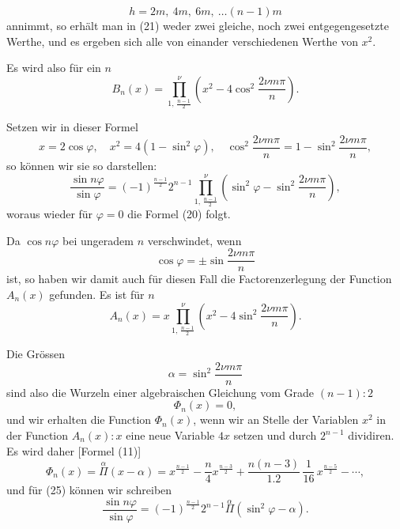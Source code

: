 \[
h = 2m,\ 4m,\ 6m,\ \ldots (n-1)m
\]
annimmt, so erhält man in (21) weder zwei gleiche, noch zwei entgegengesetzte Werthe, und es ergeben sich alle von einander verschiedenen Werthe von $x^2$.

Es wird also für ein  $n$
\[
B_n(x) = \prod\limits_{1,\,\frac{n-1}{2}}^{\nu} \left(x^2 - 4\cos^2\frac{2\nu m\pi}{n}\right). \tag{24}
\]

Setzen wir in dieser Formel
\[
x = 2\cos\varphi,\quad x^2 = 4(1-\sin^2\varphi),\quad \cos^2\frac{2\nu m\pi}{n} = 1 - \sin^2\frac{2\nu m\pi}{n},
\]
so können wir sie so darstellen:
\[
\frac{\sin n\varphi}{\sin\varphi} = (-1)^{\frac{n-1}{2}} 2^{n-1} \prod\limits_{1,\,\frac{n-1}{2}}^{\nu} \left(\sin^2\varphi - \sin^2\frac{2\nu m\pi}{n}\right), \tag{25}
\]
woraus wieder für $\varphi=0$ die Formel (20) folgt.

Da $\cos n\varphi$ bei ungeradem $n$ verschwindet, wenn
\[
\cos\varphi = \pm \sin\frac{2\nu m\pi}{n}
\]
ist, so haben wir damit auch für diesen Fall die Factorenzerlegung der Function $A_n(x)$ gefunden. Es ist für  $n$
\[
A_n(x) = x \prod\limits_{1,\,\frac{n-1}{2}}^{\nu} \left(x^2 - 4\sin^2\frac{2\nu m\pi}{n}\right). \tag{26}
\]

Die Grössen
\[
\alpha = \sin^2\frac{2\nu m\pi}{n} \tag{27}
\]
sind also die Wurzeln einer algebraischen Gleichung vom Grade $(n-1):2$
\[
\Phi_n(x) = 0,
\]
und wir erhalten die Function $\Phi_n(x)$, wenn wir an Stelle der Variablen $x^2$ in der Function $A_n(x):x$ eine neue Variable $4x$ setzen und durch $2^{n-1}$ dividiren. Es wird daher [Formel (11)]
\[
\Phi_n(x) = \overset{\alpha}{\Pi}(x-\alpha)
= x^{\frac{n-1}{2}} - \frac{n}{4} x^{\frac{n-3}{2}} + \frac{n(n-3)}{1.2}\,\frac{1}{16}\, x^{\frac{n-5}{2}} - \cdots, \tag{28}
\]
und für (25) können wir schreiben
\[
\frac{\sin n\varphi}{\sin\varphi}
= (-1)^{\frac{n-1}{2}} 2^{n-1} \overset{\alpha}{\Pi}(\sin^2\varphi - \alpha). \tag{29}
\]
